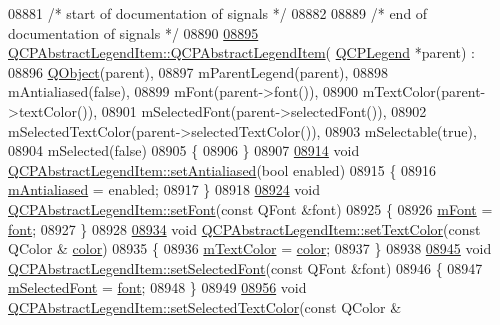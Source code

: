 \begin{DoxyCode}
08881 \textcolor{comment}{/* start of documentation of signals */}
08882 
08889 \textcolor{comment}{/* end of documentation of signals */}
08890 
\hypertarget{a00115_source_l08895}{}\hyperlink{a00023_afaff87610e8da0fa238ecf552872d774}{08895} \hyperlink{a00023_afaff87610e8da0fa238ecf552872d774}{QCPAbstractLegendItem::QCPAbstractLegendItem}(
      \hyperlink{a00045}{QCPLegend} *parent) : 
08896   \hyperlink{a00059}{QObject}(parent),
08897   mParentLegend(parent),
08898   mAntialiased(false),
08899   mFont(parent->font()),
08900   mTextColor(parent->textColor()),
08901   mSelectedFont(parent->selectedFont()),
08902   mSelectedTextColor(parent->selectedTextColor()),
08903   mSelectable(true),
08904   mSelected(false)
08905 \{
08906 \}
08907 
\hypertarget{a00115_source_l08914}{}\hyperlink{a00023_a158dc34e221b304a3e3c577b9824a88d}{08914} \textcolor{keywordtype}{void} \hyperlink{a00023_a158dc34e221b304a3e3c577b9824a88d}{QCPAbstractLegendItem::setAntialiased}(\textcolor{keywordtype}{bool} enabled)
08915 \{
08916   \hyperlink{a00023_a796a604ca3309960968aec8067bfc327}{mAntialiased} = enabled;
08917 \}
08918 
\hypertarget{a00115_source_l08924}{}\hyperlink{a00023_a409c53455d8112f71d70c0c43eb10265}{08924} \textcolor{keywordtype}{void} \hyperlink{a00023_a409c53455d8112f71d70c0c43eb10265}{QCPAbstractLegendItem::setFont}(\textcolor{keyword}{const} QFont &font)
08925 \{
08926   \hyperlink{a00023_ae916a78ac0d2a60e20a17ca2f24f9754}{mFont} = \hyperlink{a00023_ae476404706638d84fadc01021df2b19e}{font};
08927 \}
08928 
\hypertarget{a00115_source_l08934}{}\hyperlink{a00023_a6ebace6aaffaedcdab2d74e88acc2d1e}{08934} \textcolor{keywordtype}{void} \hyperlink{a00023_a6ebace6aaffaedcdab2d74e88acc2d1e}{QCPAbstractLegendItem::setTextColor}(\textcolor{keyword}{const} QColor &
      \hyperlink{a00116_ae35093fbf4f645dcefd930ca8c68b622}{color})
08935 \{
08936   \hyperlink{a00023_a974b21e9930227d281344bd2242d289d}{mTextColor} = \hyperlink{a00116_ae35093fbf4f645dcefd930ca8c68b622}{color};
08937 \}
08938 
\hypertarget{a00115_source_l08945}{}\hyperlink{a00023_a91db5aee48617a9d3206e61376807365}{08945} \textcolor{keywordtype}{void} \hyperlink{a00023_a91db5aee48617a9d3206e61376807365}{QCPAbstractLegendItem::setSelectedFont}(\textcolor{keyword}{const} QFont &font)
08946 \{
08947   \hyperlink{a00023_ab971df604306b192875a7d097feb1e21}{mSelectedFont} = \hyperlink{a00023_ae476404706638d84fadc01021df2b19e}{font};
08948 \}
08949 
\hypertarget{a00115_source_l08956}{}\hyperlink{a00023_a4d01d008ee1a5bfe9905b0397a421936}{08956} \textcolor{keywordtype}{void} \hyperlink{a00023_a4d01d008ee1a5bfe9905b0397a421936}{QCPAbstractLegendItem::setSelectedTextColor}(\textcolor{keyword}{const} QColor &

\end{DoxyCode}
